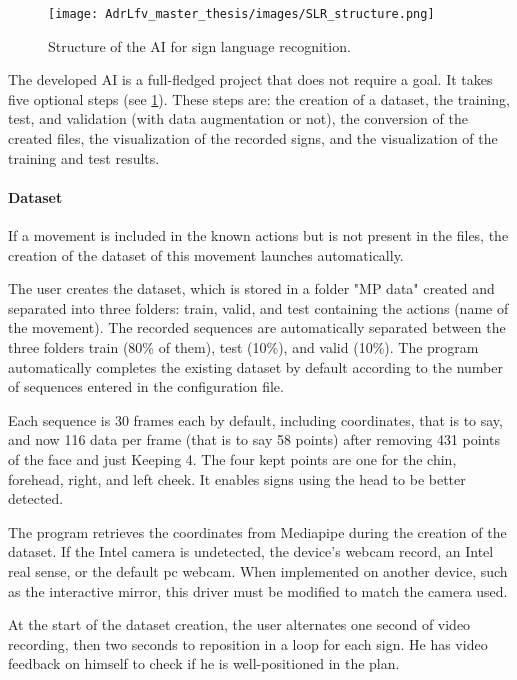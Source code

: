\begin{figure}[h]
    \centering
    \texttt{[image: AdrLfv\_master\_thesis/images/SLR\_structure.png]}
    \caption{Structure of the AI for sign language recognition.}
    \label{fig:SLR_structure}
\end{figure}

The developed AI is a full-fledged project that does not require a goal. It takes five optional steps (see \ref{fig:SLR_structure}). These steps are: the creation of a dataset, the training, test, and validation (with data augmentation or not), the conversion of the created files, the visualization of the recorded signs, and the visualization of the training and test results.

\paragraph{Dataset}

If a movement is included in the known actions but is not present in the files, the creation of the dataset of this movement launches automatically. 

The user creates the dataset, which is stored in a folder "MP data" created and separated into three folders: train, valid, and test containing the actions (name of the movement). The recorded sequences are automatically separated between the three folders train (80\% of them), test (10\%), and valid (10\%). The program automatically completes the existing dataset by default according to the number of sequences entered in the configuration file.

Each sequence is 30 frames each by default, including coordinates, that is to say, and now 116 data per frame (that is to say 58 points) after removing 431 points of the face and just Keeping 4. The four kept points are one for the chin, forehead, right, and left cheek.
It enables signs using the head to be better detected.

The program retrieves the coordinates from Mediapipe during the creation of the dataset. If the Intel camera is undetected, the device's webcam record, an Intel real sense, or the default pc webcam. When implemented on another device, such as the interactive mirror, this driver must be modified to match the camera used.

At the start of the dataset creation, the user alternates one second of video recording, then two seconds to reposition in a loop for each sign. He has video feedback on himself to check if he is well-positioned in the plan.

